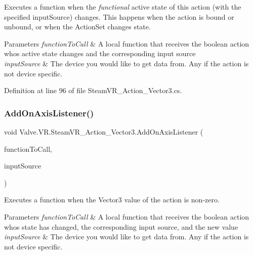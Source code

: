 Executes a function when the {\itshape functional} active state of this action (with the specified input\+Source) changes. This happens when the action is bound or unbound, or when the Action\+Set changes state. 


\begin{DoxyParams}{Parameters}
{\em function\+To\+Call} & A local function that receives the boolean action who\textquotesingle{}s active state changes and the corresponding input source\\
\hline
{\em input\+Source} & The device you would like to get data from. Any if the action is not device specific.\\
\hline
\end{DoxyParams}


Definition at line 96 of file Steam\+V\+R\+\_\+\+Action\+\_\+\+Vector3.\+cs.

\mbox{\label{class_valve_1_1_v_r_1_1_steam_v_r___action___vector3_a29dcca796420e96a856cff97a7b20924}} 
\subsubsection{\texorpdfstring{AddOnAxisListener()}{AddOnAxisListener()}}
{\footnotesize\ttfamily void Valve.\+V\+R.\+Steam\+V\+R\+\_\+\+Action\+\_\+\+Vector3.\+Add\+On\+Axis\+Listener (\begin{DoxyParamCaption}\item[{\mbox{\hyperlink{class_valve_1_1_v_r_1_1_steam_v_r___action___vector3_a9b135b663b22c421dc36dbc48d2d35b6}{Axis\+Handler}}}]{function\+To\+Call,  }\item[{\mbox{\hyperlink{namespace_valve_1_1_v_r_a82e5bf501cc3aa155444ee3f0662853f}{Steam\+V\+R\+\_\+\+Input\+\_\+\+Sources}}}]{input\+Source }\end{DoxyParamCaption})}



Executes a function when the Vector3 value of the action is non-\/zero. 


\begin{DoxyParams}{Parameters}
{\em function\+To\+Call} & A local function that receives the boolean action who\textquotesingle{}s state has changed, the corresponding input source, and the new value\\
\hline
{\em input\+Source} & The device you would like to get data from. Any if the action is not device specific.\\
\hline
\end{DoxyParams}


